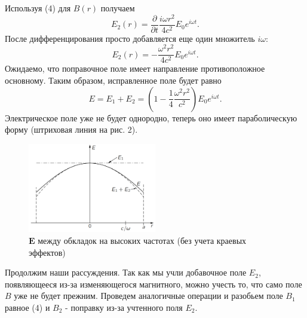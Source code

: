 \documentclass[a4paper, 12pt]{article}
\begin{document}
Используя (4) для $B(r)$ получаем
\begin{displaymath}E_{2}(r)=\frac{\partial}{\partial t} \frac{i \omega r^{2}}{4 c^{2}} E_{0} e^{i \omega t}.\end{displaymath}
После дифференцирования просто добавляется еще один множитель $i\omega$:
\begin{equation}E_{2}(r)=-\frac{\omega^{2} r^{2}}{4 c^{2}} E_{0} e^{i \omega t}.\end{equation}
Ожидаемо, что поправочное поле имеет направление противоположное основному. Таким образом, исправленное поле будет равно
\begin{equation}E=E_{1}+E_{2}=\left(1-\frac{1}{4} \frac{\omega^{2} r^{2}}{c^{2}}\right) E_{0} e^{i \omega t}.\end{equation}
Электрическое поле уже не будет однородно, теперь оно имеет параболическую форму (штриховая линия на рис. 2).
\begin{figure}[h]
    \begin{center}
    \includegraphics[width=0.5\textwidth]{feild.png}
    \end{center}
    \caption{$\boldsymbol{E}$ между обкладок на высоких частотах (без учета краевых эффектов)}
\end{figure}


Продолжим наши рассуждения. Так как мы учли добавочное поле $E_{2}$, появляющееся из-за изменяющегося магнитного, можно учесть то, что само поле $B$ уже не будет прежним. Проведем аналогичные операции и разобьем поле $B_{1}$ равное (4) и $B_{2}$ - поправку из-за учтенного поля $E_{2}$. 
\end{document}
